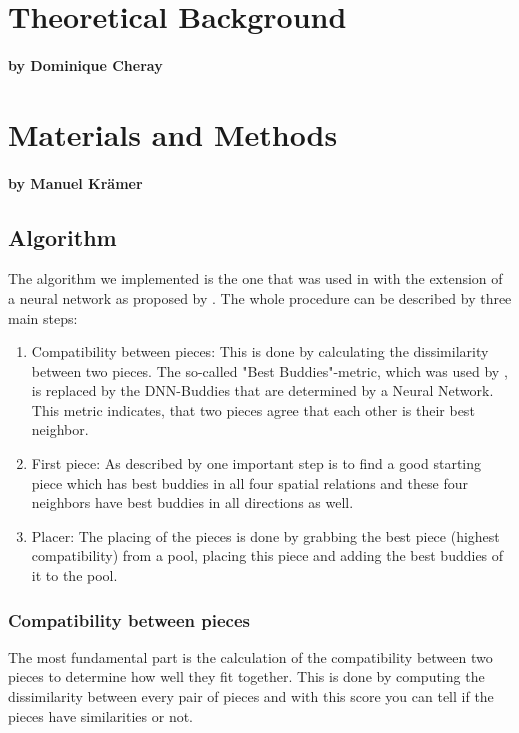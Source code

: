 \documentclass[11pt]{report}
\begin{document}
\chapter{Theoretical Background}
\subsubsection*{by Dominique Cheray}

\chapter{Materials and Methods}
\subsubsection*{by Manuel Krämer}
\section{Algorithm}
\label{sec:algo}
The algorithm we implemented is the one that was used in \cite{Paikin2015} with the extension of a neural network as proposed by \cite{sholomon2016dnn}. The whole procedure can be described by three main steps:
\begin{enumerate}
	\item Compatibility between pieces: This is done by calculating the dissimilarity between two pieces. The so-called "Best Buddies"-metric, which was used by \cite{Paikin2015}, is replaced by the DNN-Buddies that are determined by a Neural Network. This metric indicates, that two pieces agree that each other is their best neighbor.
	\item First piece: As described by \cite{Paikin2015} one important step is to find a good starting piece which has best buddies in all four spatial relations and these four neighbors have best buddies in all directions as well.
	\item Placer: The placing of the pieces is done by grabbing the best piece (highest compatibility) from a pool, placing this piece and adding the best buddies of it to the pool.
\end{enumerate}

\subsection{Compatibility between pieces}
The most fundamental part is the calculation of the compatibility between two pieces to determine how well they fit together. This is done by computing the dissimilarity between every pair of pieces and with this score you can tell if the pieces have similarities or not.
\end{document}
